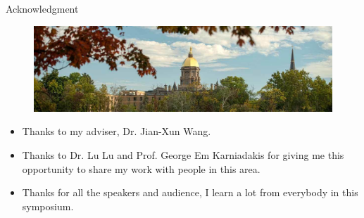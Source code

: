 \documentclass{beamer}
\begin{document}
\begin{frame}{Acknowledgment}
\begin{figure}
\includegraphics[width=1.\textwidth]{ND.jpg}
\end{figure}
\begin{itemize}
	\item Thanks to my adviser, Dr. Jian-Xun Wang.
	\item Thanks to Dr. Lu Lu and Prof. George Em Karniadakis for giving me this opportunity to share my work with people in this area.
	\item Thanks for all the speakers and audience, I learn a lot from everybody in this symposium.
\end{itemize}
\end{frame}

\end{document}
